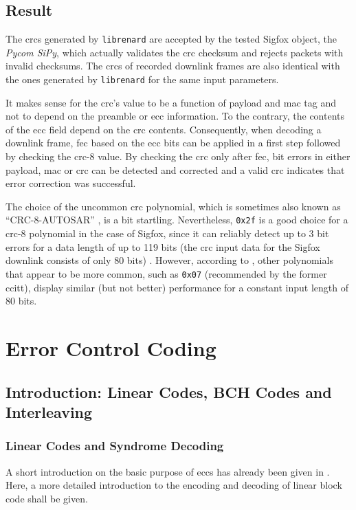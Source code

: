 \subsection{Result}
The \glspl{crc} generated by \texttt{librenard} are accepted by the tested Sigfox object, the \textit{Pycom SiPy}, which actually validates the \gls{crc} checksum and rejects packets with invalid checksums.
The \glspl{crc} of recorded downlink frames are also identical with the ones generated by \texttt{librenard} for the same input parameters.

It makes sense for the \gls{crc}'s value to be a function of payload and \gls{mac} tag and not to depend on the preamble or \gls{ecc} information.
To the contrary, the contents of the \gls{ecc} field depend on the \gls{crc} contents.
Consequently, when decoding a downlink frame, \gls{fec} based on the \gls{ecc} bits can be applied in a first step followed by checking the \gls{crc}-8 value.
By checking the \gls{crc} only after \gls{fec}, bit errors in either payload, \gls{mac} or \gls{crc} can be detected and corrected and a valid \gls{crc} indicates that error correction was successful.

The choice of the uncommon \gls{crc} polynomial, which is sometimes also known as ``CRC-8-AUTOSAR'' \cite[written in Koopman notation ``\texttt{0x97}'']{crc8zoo}, is a bit startling.
Nevertheless, \texttt{0x2f} is a good choice for a \gls{crc}-8 polynomial in the case of Sigfox, since it can reliably detect up to 3 bit errors for a data length of up to 119 bits (the \gls{crc} input data for the Sigfox downlink consists of only 80 bits) \cite[again written in Koopman notation ``\texttt{0x97}'']{crc8_polynomial}.
However, according to \cite{crc8zoo}, other polynomials that appear to be more common, such as \texttt{0x07} (recommended by the former \gls{ccitt}), display similar (but not better) performance for a constant input length of 80 bits.

\FloatBarrier
\section{Error Control Coding}
\label{sec:downlink_ecc}
\subsection{Introduction: Linear Codes, BCH Codes and Interleaving}
\label{sec:downlink_ecc_intro}
\subsubsection{Linear Codes and Syndrome Decoding}
A short introduction on the basic purpose of \glspl{ecc} has already been given in .
Here, a more detailed introduction to the encoding and decoding of linear block code shall be given.

